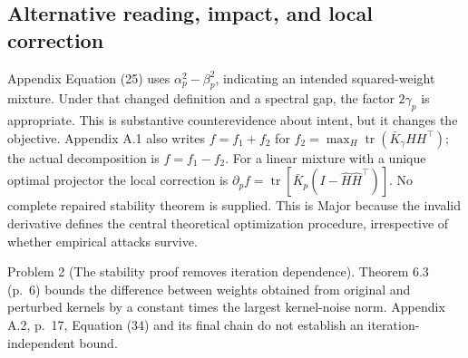 \documentclass[10pt]{article}
\begin{document}
\subsection*{Alternative reading, impact, and local correction}
Appendix Equation (25) uses \(\alpha_p^2-\beta_p^2\), indicating an intended squared-weight mixture. Under that changed definition and a spectral gap, the factor \(2\gamma_p\) is appropriate. This is substantive counterevidence about intent, but it changes the objective. Appendix A.1 also writes \(f=f_1+f_2\) for \(f_2=\max_H\operatorname{tr}(\bar K_\gamma HH^\top)\); the actual decomposition is \(f=f_1-f_2\). For a linear mixture with a unique optimal projector the local correction is \(\partial_pf=\operatorname{tr}[\bar K_p(I-\widehat H\widehat H^\top)]\). No complete repaired stability theorem is supplied. This is Major because the invalid derivative defines the central theoretical optimization procedure, irrespective of whether empirical attacks survive.\par
Problem 2 (The stability proof removes iteration dependence).  Theorem 6.3 (p. 6) bounds the difference between weights obtained from original and perturbed kernels by a constant times the largest kernel-noise norm. Appendix A.2, p. 17, Equation (34) and its final chain do not establish an iteration-independent bound.\par
\end{document}
